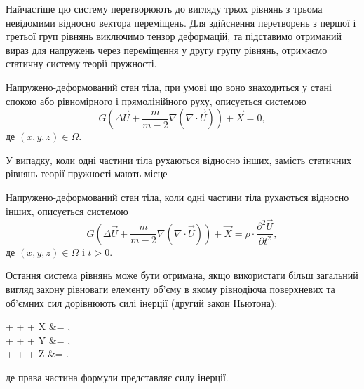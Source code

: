 Найчастіше цю систему перетворюють до вигляду трьох рівнянь з трьома невідомими відносно вектора переміщень. Для здійснення перетворень з першої і третьої груп рівнянь виключимо тензор деформацій, та підставимо отриманий вираз для напружень через переміщення у другу групу рівнянь, отримаємо статичну систему теорії пружності.

\begin{th_equation}
	Напружено-деформований стан тіла, при умові що воно знаходиться у стані спокою або рівномірного і прямолінійного руху, описується системою
	\begin{equation}
		G \left( \Delta \vec U + \frac{m}{m - 2} \nabla \left(\nabla \cdot \vec U\right) \right) + \vec X = 0,
	\end{equation}
	де $(x, y, z) \in \Omega$.
\end{th_equation}

У випадку, коли одні частини тіла рухаються відносно інших, замість статичних рівнянь теорії пружності мають місце 
\begin{th_equation}
	Напружено-деформований стан тіла, коли одні частини тіла рухаються відносно інших, описується системою
	\begin{equation}
		G \left( \Delta \vec U + \frac{m}{m - 2} \nabla \left(\nabla \cdot \vec U\right) \right) + \vec X = \rho \cdot \frac{\partial^2 \vec U}{\partial t^2},
	\end{equation}
	де $(x, y, z) \in \Omega$ і $ t > 0$.
\end{th_equation}

\begin{remark}
	Остання система рівнянь може бути отримана, якщо використати більш загальний вигляд закону рівноваги елементу об'єму в якому рівнодіюча поверхневих та об'ємних сил дорівнюють силі інерції (другий закон Ньютона):
	\begin{system}
		 +  +  + X &= \rho \cdot {}, \\
		 +  +  + Y &= \rho \cdot {}, \\
		 +  +  + Z &= \rho \cdot {}.
	\end{system}
	де права частина формули представляє силу інерції.
\end{remark}


